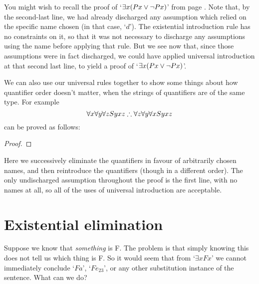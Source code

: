 You might wish to recall the proof of `$\exists x (Px \vee \neg Px)$' from page \pageref{exexmid}. Note that, by the second-last line, we had already discharged any assumption which relied on the specific name chosen (in that case, `$d$'). The existential introduction rule has no constraints on it, so that it was not necessary to discharge any assumptions using the name before applying that rule. But we see now that, since those assumptions were in fact discharged, we could have applied universal introduction at that second last line, to yield a proof of `$\exists x (Px \vee \neg Px)$'.

We can also use our universal rules together to show some things about how quantifier order doesn't matter, when the strings of quantifiers are of the same type. For example $$\forall x \forall y \forall z Syxz \mathrel{\therefore} \forall z \forall y \forall x Syxz$$ can be proved as follows: \begin{proof}
\end{proof} Here we successively eliminate the quantifiers in favour of arbitrarily chosen names, and then reintroduce the quantifiers (though in a different order). The only undischarged assumption throughout the proof is the first line, with no names at all, so all of the uses of universal introduction are acceptable.


\section{Existential elimination}\label{exelim}
Suppose we know that \emph{something} is F. The problem is that simply knowing this does not tell us which thing is F. So it would seem that from `$\exists x Fx$' we cannot immediately conclude `$Fa$', `$Fe_{23}$', or any other substitution instance of the sentence. What can we do?

